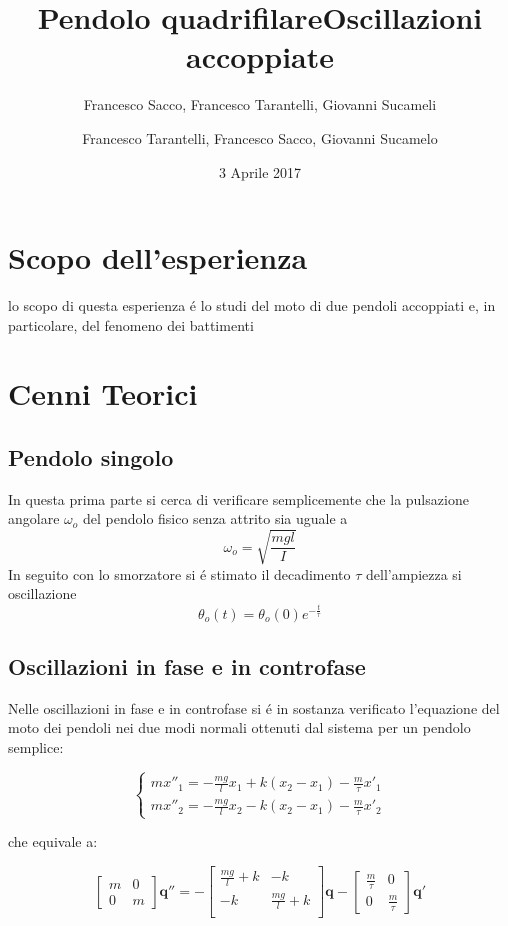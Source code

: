 \documentclass{exam}
\date{3 Aprile 2017}
\title{Pendolo quadrifilare}
\author{Francesco Sacco, Francesco Tarantelli, Giovanni Sucameli}
\author{Francesco Tarantelli, Francesco Sacco, Giovanni Sucamelo}
\title{Oscillazioni accoppiate}
\begin{document}
	\maketitle
	\section{Scopo dell'esperienza}
		lo scopo di questa esperienza \'e lo studi del moto di due pendoli accoppiati e, in particolare, del fenomeno dei battimenti


	\section{Cenni Teorici}
		\subsection{Pendolo singolo}
			In questa prima parte si cerca di verificare semplicemente che la pulsazione angolare $\omega_o$ del pendolo fisico senza attrito sia uguale a 
			\begin{equation}
				\omega_o=\sqrt{\frac{mgl}{I}}
			\end{equation}
			In seguito con lo smorzatore si \'e stimato il decadimento $\tau $ dell'ampiezza si oscillazione
			\begin{equation}
				\theta_o(t)=\theta_o(0)e^{-\frac{t}{\tau}}
			\end{equation}
	\subsection{Oscillazioni in fase e in controfase}
		Nelle oscillazioni in fase e in controfase si \'e in sostanza verificato l'equazione del moto dei pendoli nei due modi normali ottenuti dal sistema per un pendolo semplice:

		\begin{equation}
			\begin{cases} 
				m x''_1=-\frac{mg}{l}x_1 + k(x_2-x_1) -\frac{m}{\tau} x'_1 \\
				m x''_2=-\frac{mg}{l}x_2 -  k(x_2-x_1) - \frac{m}{\tau} x'_2
			\end{cases}
		\end{equation}

		che equivale a:

		\begin{equation}
			\begin{bmatrix}
				m & 0 \\
				0 & m
			\end{bmatrix}
			\mathbf{q''}=-
			\begin{bmatrix}
				\frac{mg}{l} + k & -k \\
				-k & \frac{mg}{l} + k \\
			\end{bmatrix}
			\mathbf{q} -
			\begin{bmatrix}
				\frac{m}{\tau} & 0 \\
				0 & \frac{m}{\tau} 
			\end{bmatrix}
			\mathbf{q'} 
		\end{equation}
\end{document}
